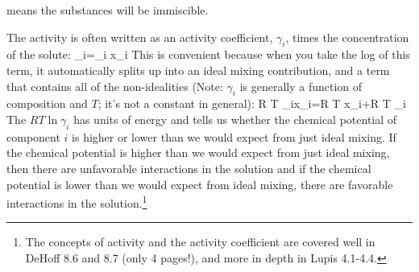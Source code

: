 \documentclass[12pt]{article}
\begin{document}
means the substances will be immiscible.\par
The activity is often written as an activity coefficient, \(\gamma _i\), times the concentration of the solute:
\eqs {}_i=\gamma _i x_i\eqe
This is convenient because when you take the log of this term, it automatically splits up into an ideal mixing contribution, and a term that contains all of the non-idealities (Note: \(\gamma _i\) is generally a function of composition and $T$; it's not a constant in general):
\eqs R T \ln  \gamma _ix_i=R T \ln  x_i+R T \ln  \gamma _i\eqe
The \(R T \ln  \gamma _i\) has units of energy and tells us whether the chemical potential of component $i$ is higher or lower than we would expect from just ideal mixing. If the chemical potential is higher than we would expect from just ideal mixing, then there are unfavorable interactions in the solution and if the chemical potential is lower than we would expect from ideal mixing, there are favorable interactions in the solution.\footnote{The concepts of activity and the activity coefficient are covered well in DeHoff 8.6 and 8.7 (only 4 pages!), and more in depth in Lupis 4.1-4.4.}\par
\end{document}
